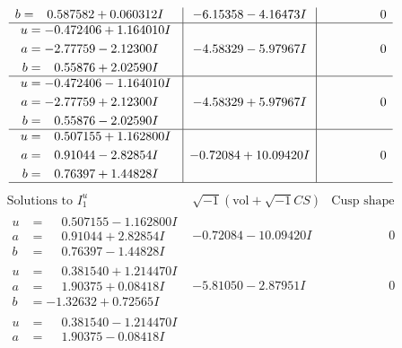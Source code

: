 \documentclass[1p]{elsarticle_modified}
\theoremstyle{definition}
\newcommand{\I}{\sqrt{-1}}
\begin{document}
$$\begin{array}{c|c|c}
\begin{aligned}
b &= \phantom{-}0.587582 + 0.060312 I\end{aligned}
 & -6.15358 - 4.16473 I & \phantom{-0.000000 } 0 \\ \hline\begin{aligned}
u &= -0.472406 + 1.164010 I \\
a &= -2.77759 - 2.12300 I \\
b &= \phantom{-}0.55876 + 2.02590 I\end{aligned}
 & -4.58329 - 5.97967 I & \phantom{-0.000000 } 0 \\ \hline\begin{aligned}
u &= -0.472406 - 1.164010 I \\
a &= -2.77759 + 2.12300 I \\
b &= \phantom{-}0.55876 - 2.02590 I\end{aligned}
 & -4.58329 + 5.97967 I & \phantom{-0.000000 } 0 \\ \hline\begin{aligned}
u &= \phantom{-}0.507155 + 1.162800 I \\
a &= \phantom{-}0.91044 - 2.82854 I \\
b &= \phantom{-}0.76397 + 1.44828 I\end{aligned}
 & -0.72084 + 10.09420 I & \phantom{-0.000000 } 0\\
 \hline 
 \end{array}$$\newpage$$\begin{array}{c|c|c}  
\text{Solutions to }I^u_{1}& \I (\text{vol} + \sqrt{-1}CS) & \text{Cusp shape}\\
 \hline 
\begin{aligned}
u &= \phantom{-}0.507155 - 1.162800 I \\
a &= \phantom{-}0.91044 + 2.82854 I \\
b &= \phantom{-}0.76397 - 1.44828 I\end{aligned}
 & -0.72084 - 10.09420 I & \phantom{-0.000000 } 0 \\ \hline\begin{aligned}
u &= \phantom{-}0.381540 + 1.214470 I \\
a &= \phantom{-}1.90375 + 0.08418 I \\
b &= -1.32632 + 0.72565 I\end{aligned}
 & -5.81050 - 2.87951 I & \phantom{-0.000000 } 0 \\ \hline\begin{aligned}
u &= \phantom{-}0.381540 - 1.214470 I \\
a &= \phantom{-}1.90375 - 0.08418 I \\

\end{aligned}
\end{array}$$
\end{document}
